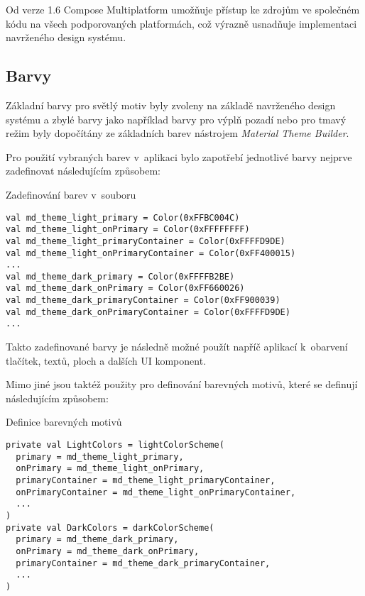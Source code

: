 Od verze 1.6 Compose Multiplatform umožňuje přístup ke zdrojům ve společném kódu na všech podporovaných platformách, což výrazně usnadňuje 
implementaci navrženého design systému. 


\subsection*{Barvy} \label{colorSection}
Základní barvy pro světlý motiv byly zvoleny na základě navrženého design systému
a zbylé barvy jako například barvy pro výplň pozadí nebo pro tmavý režim byly dopočítány ze základních barev nástrojem \textit{Material Theme Builder}.

Pro použití vybraných barev v~aplikaci bylo zapotřebí jednotlivé barvy nejprve zadefinovat následujícím způsobem:

\begin{listing}[H]
\caption{Zadefinování barev v~souboru }\label{lst:Colors}
\begin{verbatim}
val md_theme_light_primary = Color(0xFFBC004C)
val md_theme_light_onPrimary = Color(0xFFFFFFFF)
val md_theme_light_primaryContainer = Color(0xFFFFD9DE)
val md_theme_light_onPrimaryContainer = Color(0xFF400015)
...
val md_theme_dark_primary = Color(0xFFFFB2BE)
val md_theme_dark_onPrimary = Color(0xFF660026)
val md_theme_dark_primaryContainer = Color(0xFF900039)
val md_theme_dark_onPrimaryContainer = Color(0xFFFFD9DE)
...
\end{verbatim}
\end{listing}

Takto zadefinované barvy je následně možné použít napříč aplikací k~obarvení tlačítek, textů, ploch a dalších UI komponent.

Mimo jiné jsou taktéž použity pro definování barevných motivů, které se definují následujícím způsobem:
\begin{listing}[H]
\caption{Definice barevných motivů}\label{lst:ThemeDef}
\begin{verbatim}
private val LightColors = lightColorScheme(
  primary = md_theme_light_primary,
  onPrimary = md_theme_light_onPrimary,
  primaryContainer = md_theme_light_primaryContainer,
  onPrimaryContainer = md_theme_light_onPrimaryContainer,
  ...
)
private val DarkColors = darkColorScheme(
  primary = md_theme_dark_primary,
  onPrimary = md_theme_dark_onPrimary,
  primaryContainer = md_theme_dark_primaryContainer,
  ...
)
\end{verbatim}
\end{listing}

